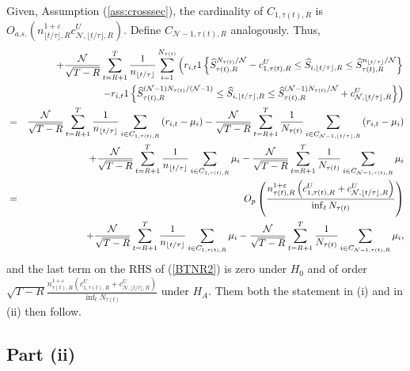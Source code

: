 \noindent Given, Assumption (\ref{ass:crosssec}), the cardinality of $%
C_{1,\tau(t),R}$ is $O_{a.s.}\left( n_{\lfloor t/\tau
\rfloor ,R}^{1+\varepsilon }c_{\mathcal{N},\lfloor t/\tau \rfloor
,R}^{U}\right) .$ Define $C_{\mathcal{N}-1,\tau(t),R}$
analogously. Thus,%
\begin{eqnarray}
&&+\frac{\mathcal{N}}{\sqrt{T-R}}\sum_{t=R+1}^{T}\frac{1}{n_{\lfloor t/\tau
\rfloor }}\sum_{i=1}^{N_{\tau(t)}}\left( r_{i,t}1\left\{ 
\widehat{S}_{\tau(t),R}^{N_{\tau(t)}/%
\mathcal{N}}-c_{1,\tau(t),R}^{U}\leq \widehat{S}_{i,\lfloor
t/\tau \rfloor ,R}\leq \widehat{S}_{\tau(t),R}^{n_{\lfloor
t/\tau \rfloor }/\mathcal{N}}\right\} \right.   \notag \\
&&\left. -r_{i,t}1\left\{ \widehat{S}_{\tau(t),R}^{(\mathcal{%
N}-1)N_{\tau(t)}/(\mathcal{N}-1)}\leq \widehat{S}_{i,\lfloor
t/\tau \rfloor ,R}\leq \widehat{S}_{\tau(t),R}^{(\mathcal{N}%
-1)N_{\tau(t)}/\mathcal{N}}+c_{\mathcal{N},\lfloor t/\tau
\rfloor ,R}^{U}\right\} \right)   \notag \\
&=&\frac{\mathcal{N}}{\sqrt{T-R}}\sum_{t=R+1}^{T}\frac{1}{n_{\lfloor t/\tau
\rfloor }}\sum_{i\in C_{1,\tau(t),R}}^{{}}\left( r_{i,t}-\mu
_{i}\right) -\frac{\mathcal{N}}{\sqrt{T-R}}\sum_{t=R+1}^{T}\frac{1}{%
N_{\tau(t)}}\sum_{i\in C_{\mathcal{N}-1,\lfloor t/\tau
\rfloor ,R}}^{{}}\left( r_{i,t}-\mu _{i}\right)   \notag \\
&&+\frac{\mathcal{N}}{\sqrt{T-R}}\sum_{t=R+1}^{T}\frac{1}{n_{\lfloor t/\tau
\rfloor }}\sum_{i\in C_{1,\tau(t),R}}^{{}}\mu _{i}-\frac{%
\mathcal{N}}{\sqrt{T-R}}\sum_{t=R+1}^{T}\frac{1}{N_{\tau(t)}}%
\sum_{i\in C_{\mathcal{N}-1,\tau(t),R}}^{{}}\mu _{i}  \notag
\\
&=&O_{p}\left( \frac{n_{\tau(t),R}^{1+\varepsilon }\left(
c_{1,\tau(t),R}^{U}+c_{\mathcal{N},\lfloor t/\tau \rfloor
,R}^{U}\right) }{\inf_{t}N_{\tau(t)}}\right)   \notag \\
&&+\frac{\mathcal{N}}{\sqrt{T-R}}\sum_{t=R+1}^{T}\frac{1}{n_{\lfloor t/\tau
\rfloor }}\sum_{i\in C_{1,\tau(t),R}}^{{}}\mu _{i}-\frac{%
\mathcal{N}}{\sqrt{T-R}}\sum_{t=R+1}^{T}\frac{1}{N_{\tau(t)}}%
\sum_{i\in C_{\mathcal{N}-1,\tau(t),R}}^{{}}\mu _{i},
\label{BTNR2}
\end{eqnarray}%
and the last term on the RHS of (\ref{BTNR2}) is zero under $H_{0}$ and of
order $\sqrt{T-R}\frac{n_{\tau(t),R}^{1+\varepsilon }\left(
c_{1,\tau(t),R}^{U}+c_{\mathcal{N},\lfloor t/\tau \rfloor
,R}^{U}\right) }{\inf_{t}N_{\tau(t)}}$ under $H_{A}.$ Them 
{\small both the statement in (i) and in (ii) then follow.}

\subsection{Part (ii)}

